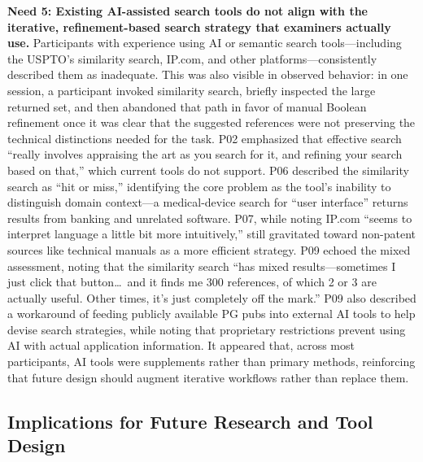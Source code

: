 \documentclass[sigconf]{acmart}
\begin{document}
\smallskip\noindent\textbf{Need 5: Existing AI-assisted search tools do not
align with the iterative, refinement-based search strategy that examiners
actually use.}
Participants with experience using AI or semantic search tools---including the
USPTO's similarity search, IP.com, and other platforms---consistently
described them as inadequate. This was also visible in observed behavior: in
one session, a participant invoked similarity search, briefly inspected the
large returned set, and then abandoned that path in favor of manual Boolean
refinement once it was clear that the suggested references were not preserving
the technical distinctions needed for the task. P02 emphasized that effective
search ``really
involves appraising the art as you search for it, and refining your search
based on that,'' which current tools do not support. P06 described the
similarity search as ``hit or miss,'' identifying the core problem as the
tool's inability to distinguish domain context---a medical-device search for
``user interface'' returns results from banking and unrelated software. P07,
while noting IP.com ``seems to interpret language a little bit more
intuitively,'' still gravitated toward non-patent sources like technical
manuals as a more efficient strategy. P09 echoed the mixed assessment, noting
that the similarity search ``has mixed results---sometimes I just click that
button\ldots\ and it finds me 300 references, of which 2 or 3 are actually
useful. Other times, it's just completely off the mark.'' P09 also described
a workaround of feeding publicly available PG pubs into external AI tools to
help devise search strategies, while noting that proprietary restrictions
prevent using AI with actual application information. It appeared that, across
most participants, AI tools were supplements rather than primary methods,
reinforcing that future design should augment iterative workflows rather than
replace them.

\subsection{Implications for Future Research and Tool Design}
\end{document}
